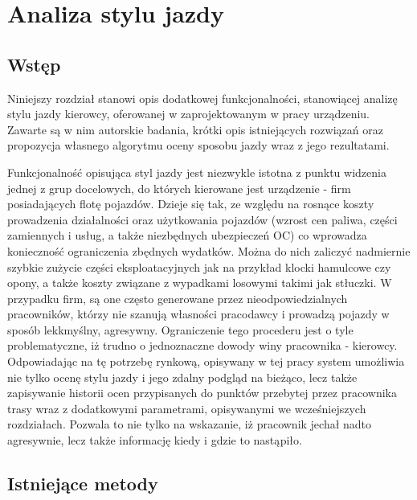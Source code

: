\chapter{Analiza stylu jazdy}

\section{Wstęp}

Niniejszy rozdział stanowi opis dodatkowej funkcjonalności, stanowiącej analizę stylu jazdy kierowcy, oferowanej w zaprojektowanym w pracy urządzeniu. Zawarte są w nim autorskie badania, krótki opis istniejących rozwiązań oraz propozycja własnego algorytmu oceny sposobu jazdy wraz z jego rezultatami. 

Funkcjonalność opisująca styl jazdy jest niezwykle istotna z punktu widzenia jednej z grup docelowych, do których kierowane jest urządzenie - firm posiadających flotę pojazdów. Dzieje się tak, ze względu na rosnące koszty prowadzenia działalności oraz użytkowania pojazdów (wzrost cen paliwa, części zamiennych i usług, a także niezbędnych ubezpieczeń OC) co wprowadza konieczność ograniczenia zbędnych wydatków. Można do nich zaliczyć nadmiernie szybkie zużycie części eksploatacyjnych jak na przykład klocki hamulcowe czy opony, a także koszty związane z wypadkami losowymi takimi jak stłuczki. W przypadku firm, są one często generowane przez nieodpowiedzialnych pracowników, którzy nie szanują własności pracodawcy i prowadzą pojazdy w sposób lekkmyślny, agresywny. Ograniczenie tego procederu jest o tyle problematyczne, iż trudno o jednoznaczne dowody winy pracownika - kierowcy. Odpowiadając na tę potrzebę rynkową, opisywany w tej pracy system umożliwia nie tylko ocenę stylu jazdy i jego zdalny podgląd na bieżąco, lecz także zapisywanie historii ocen przypisanych do punktów przebytej przez pracownika trasy wraz z dodatkowymi parametrami, opisywanymi we wcześniejszych rozdziałach. Pozwala to nie tylko na wskazanie, iż pracownik jechał nadto agresywnie, lecz także informację kiedy i gdzie to nastąpiło.

\section{Istniejące metody}

